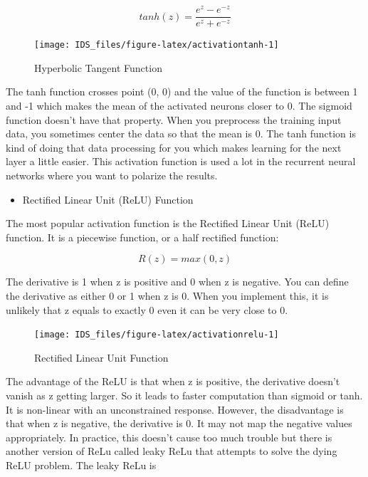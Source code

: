 \documentclass[12pt,]{krantz}
\providecommand{\tightlist}{%
  \setlength{\itemsep}{0pt}\setlength{\parskip}{0pt}}
\begin{document}
\begin{equation}
tanh(z) = \frac{e^{z} - e^{-z}}{e^{z} + e^{-z}}
\label{eq:tanh}
\end{equation}

\begin{figure}

{\centering \texttt{[image: IDS\_files/figure-latex/activationtanh-1]} 

}

\caption{Hyperbolic Tangent Function}\label{fig:activationtanh}
\end{figure}

The tanh function crosses point (0, 0) and the value of the function is between 1 and -1 which makes the mean of the activated neurons closer to 0. The sigmoid function doesn't have that property. When you preprocess the training input data, you sometimes center the data so that the mean is 0. The tanh function is kind of doing that data processing for you which makes learning for the next layer a little easier. This activation function is used a lot in the recurrent neural networks where you want to polarize the results.

\begin{itemize}
\tightlist
\item
  Rectified Linear Unit (ReLU) Function
\end{itemize}

The most popular activation function is the Rectified Linear Unit (ReLU) function. It is a piecewise function, or a half rectified function:

\[R(z) = max(0, z)\]

The derivative is 1 when z is positive and 0 when z is negative. You can define the derivative as either 0 or 1 when z is 0. When you implement this, it is unlikely that z equals to exactly 0 even it can be very close to 0.

\begin{figure}

{\centering \texttt{[image: IDS\_files/figure-latex/activationrelu-1]} 

}

\caption{Rectified Linear Unit Function}\label{fig:activationrelu}
\end{figure}

The advantage of the ReLU is that when z is positive, the derivative doesn't vanish as z getting larger. So it leads to faster computation than sigmoid or tanh. It is non-linear with an unconstrained response. However, the disadvantage is that when z is negative, the derivative is 0. It may not map the negative values appropriately. In practice, this doesn't cause too much trouble but there is another version of ReLu called leaky ReLu that attempts to solve the dying ReLU problem. The leaky ReLu is
\end{document}
